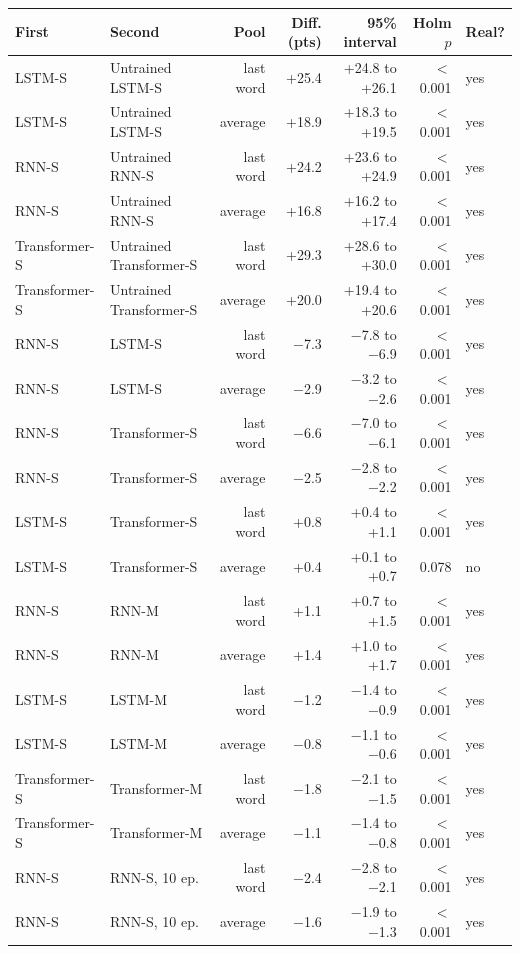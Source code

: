 \begin{tabular}{@{}llrrrrl@{}}
\toprule
First & Second & Pool & Diff. (pts) & 95\% interval & Holm $p$ & Real? \\
\midrule
LSTM-S & Untrained LSTM-S & last word & +25.4 & +24.8 to +26.1 & $<$0.001 & yes \\
LSTM-S & Untrained LSTM-S & average & +18.9 & +18.3 to +19.5 & $<$0.001 & yes \\
RNN-S & Untrained RNN-S & last word & +24.2 & +23.6 to +24.9 & $<$0.001 & yes \\
RNN-S & Untrained RNN-S & average & +16.8 & +16.2 to +17.4 & $<$0.001 & yes \\
Transformer-S & Untrained Transformer-S & last word & +29.3 & +28.6 to +30.0 & $<$0.001 & yes \\
Transformer-S & Untrained Transformer-S & average & +20.0 & +19.4 to +20.6 & $<$0.001 & yes \\
RNN-S & LSTM-S & last word & $-$7.3 & $-$7.8 to $-$6.9 & $<$0.001 & yes \\
RNN-S & LSTM-S & average & $-$2.9 & $-$3.2 to $-$2.6 & $<$0.001 & yes \\
RNN-S & Transformer-S & last word & $-$6.6 & $-$7.0 to $-$6.1 & $<$0.001 & yes \\
RNN-S & Transformer-S & average & $-$2.5 & $-$2.8 to $-$2.2 & $<$0.001 & yes \\
LSTM-S & Transformer-S & last word & +0.8 & +0.4 to +1.1 & $<$0.001 & yes \\
LSTM-S & Transformer-S & average & +0.4 & +0.1 to +0.7 & 0.078 & no \\
RNN-S & RNN-M & last word & +1.1 & +0.7 to +1.5 & $<$0.001 & yes \\
RNN-S & RNN-M & average & +1.4 & +1.0 to +1.7 & $<$0.001 & yes \\
LSTM-S & LSTM-M & last word & $-$1.2 & $-$1.4 to $-$0.9 & $<$0.001 & yes \\
LSTM-S & LSTM-M & average & $-$0.8 & $-$1.1 to $-$0.6 & $<$0.001 & yes \\
Transformer-S & Transformer-M & last word & $-$1.8 & $-$2.1 to $-$1.5 & $<$0.001 & yes \\
Transformer-S & Transformer-M & average & $-$1.1 & $-$1.4 to $-$0.8 & $<$0.001 & yes \\
RNN-S & RNN-S, 10 ep. & last word & $-$2.4 & $-$2.8 to $-$2.1 & $<$0.001 & yes \\
RNN-S & RNN-S, 10 ep. & average & $-$1.6 & $-$1.9 to $-$1.3 & $<$0.001 & yes \\

\end{tabular}
